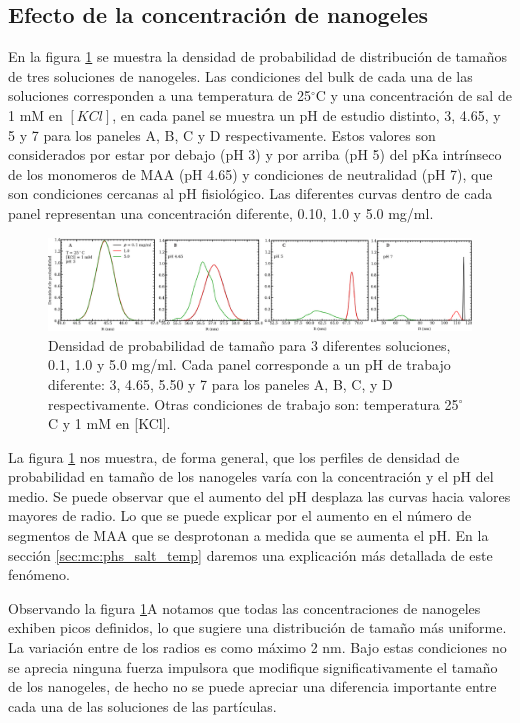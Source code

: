 	
	
	\subsection{Efecto de la concentraci\'on de nanogeles}
	En la figura \ref{fig:mc:densidad-probabilidad} se muestra la densidad de probabilidad de distribuci\'on de tama\~nos de tres soluciones de nanogeles. Las condiciones del bulk de cada una de las soluciones corresponden a una temperatura de 25$^\circ$C y una concentraci\'on de sal de 1 mM en $[KCl]$, en cada panel se muestra un pH de estudio distinto, 3, 4.65, y 5 y 7 para los paneles A, B, C y D respectivamente. Estos valores son considerados por estar por debajo (pH 3) y por arriba (pH 5) del pKa intr\'inseco de los monomeros de MAA (pH 4.65) y condiciones de neutralidad (pH 7), que son condiciones cercanas al pH fisiol\'ogico. Las diferentes curvas dentro de cada panel representan una concentraci\'on diferente, 0.10, 1.0 y 5.0 mg/ml.
	
	\begin{figure}
		\centering
		\includegraphics[width=0.99\linewidth]{Figures/graph-mc/sizes-phs.pdf}
		\caption{Densidad de probabilidad de tama\~no para 3 diferentes soluciones, 0.1, 1.0 y 5.0 mg/ml. Cada panel corresponde a un pH de trabajo diferente: 3, 4.65, 5.50 y 7 para los paneles A, B, C, y D respectivamente. Otras condiciones de trabajo son: temperatura 25$^\circ$C y 1 mM en [KCl].}
		\label{fig:mc:densidad-probabilidad}
	\end{figure}
	
	La figura \ref{fig:mc:densidad-probabilidad} nos muestra, de forma general, que los perfiles de densidad de probabilidad en tama\~no de los nanogeles var\'ia con la concentraci\'on y el pH del medio. Se puede observar que el aumento del pH desplaza las curvas hacia valores mayores de radio. Lo que se puede explicar por el aumento en el n\'umero de segmentos de MAA que se desprotonan a medida que se aumenta el pH. En la secci\'on \ref{sec:mc:phs_salt_temp} daremos una explicaci\'on m\'as detallada de este fen\'omeno.
	
	Observando la figura \ref{fig:mc:densidad-probabilidad}A notamos que todas las concentraciones de nanogeles exhiben picos definidos, lo que sugiere una distribuci\'on de tama\~no m\'as uniforme. La variaci\'on entre de los radios es como m\'aximo 2 nm. Bajo estas condiciones no se aprecia ninguna fuerza impulsora que modifique significativamente el tama\~no de los nanogeles, de hecho no se puede apreciar una diferencia importante entre cada una de las soluciones de las part\'iculas.
	

